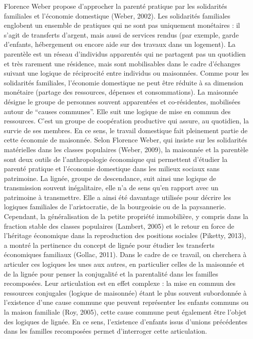 \documentclass[
  12pt,
]{book}
\begin{document}
Florence Weber propose d'approcher la parenté pratique par les
solidarités familiales et l'économie domestique (Weber, 2002). Les
solidarités familiales englobent un ensemble de pratiques qui ne sont
pas uniquement monétaires : il s'agit de transferts d'argent, mais aussi
de services rendus (par exemple, garde d'enfants, hébergement ou encore
aide sur des travaux dans un logement). La parentèle est un réseau
d'individus apparentés qui ne partagent pas un quotidien et très
rarement une résidence, mais sont mobilisables dans le cadre d'échanges
suivant une logique de réciprocité entre individus ou maisonnées. Comme
pour les solidarités familiales, l'économie domestique ne peut être
réduite à sa dimension monétaire (partage des ressources, dépenses et
consommations). La maisonnée désigne le groupe de personnes souvent
apparentées et co-résidentes, mobilisées autour de ``causes communes''.
Elle suit une logique de mise en commun des ressources. C'est un groupe
de coopération productive qui assure, au quotidien, la survie de ses
membres. En ce sens, le travail domestique fait pleinement partie de
cette économie de maisonnée. Selon Florence Weber, qui insiste sur les
solidarités matérielles dans les classes populaires (Weber, 2009), la
maisonnée et la parentèle sont deux outils de l'anthropologie économique
qui permettent d'étudier la parenté pratique et l'économie domestique
dans les milieux sociaux sans patrimoine. La lignée, groupe de
descendance, suit ainsi une logique de transmission souvent
inégalitaire, elle n'a de sens qu'en rapport avec un patrimoine à
transmettre. Elle a ainsi été davantage utilisée pour décrire les
logiques familiales de l'aristocratie, de la bourgeoisie ou de la
paysannerie. Cependant, la généralisation de la petite propriété
immobilière, y compris dans la fraction stable des classes populaires
(Lambert, 2005) et le retour en force de l'héritage économique dans la
reproduction des positions sociales (Piketty, 2013), a montré la
pertinence du concept de lignée pour étudier les transferts économiques
familiaux (Gollac, 2011). Dans le cadre de ce travail, on cherchera à
articuler ces logiques les unes aux autres, en particulier celles de la
maisonnée et de la lignée pour penser la conjugalité et la parentalité
dans les familles recomposées. Leur articulation est en effet complexe :
la mise en commun des ressources conjugales (logique de maisonnée) étant
le plus souvent subordonnée à l'existence d'une cause commune que
peuvent représenter les enfants communs ou la maison familiale (Roy,
2005), cette cause commune peut également être l'objet des logiques de
lignée. En ce sens, l'existence d'enfants issus d'unions précédentes
dans les familles recomposées permet d'interroger cette articulation.
\end{document}
